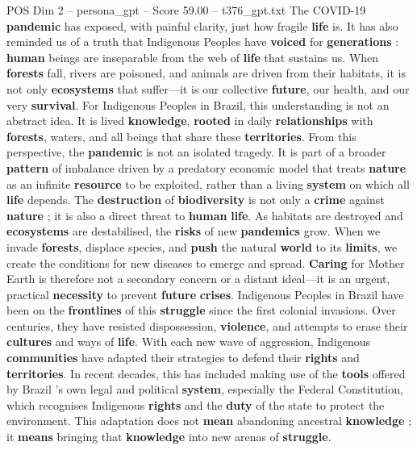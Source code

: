\begin{textsample}{POS Dim 2 – persona\_gpt – Score 59.00 – t376\_gpt.txt}  \label{ex:f2_pos_013}
The COVID-19 \textbf{pandemic} has exposed, with painful clarity, just how fragile \textbf{life} is.
It has also reminded us of a truth that Indigenous Peoples have \textbf{voiced} for \textbf{generations} : \textbf{human} beings are inseparable from the web of \textbf{life} that sustains us.
When \textbf{forests} fall, rivers are poisoned, and animals are driven from their habitats, it is not only \textbf{ecosystems} that suffer—it is our collective \textbf{future}, our health, and our very \textbf{survival}.
For Indigenous Peoples in Brazil, this understanding is not an abstract idea.
It is lived \textbf{knowledge}, \textbf{rooted} in daily \textbf{relationships} with \textbf{forests}, waters, and all beings that share these \textbf{territories}.
From this perspective, the \textbf{pandemic} is not an isolated tragedy.
It is part of a broader \textbf{pattern} of imbalance driven by a predatory economic model that treats \textbf{nature} as an infinite \textbf{resource} to be exploited, rather than a living \textbf{system} on which all \textbf{life} depends.
The \textbf{destruction} of \textbf{biodiversity} is not only a \textbf{crime} against \textbf{nature} ; it is also a direct threat to \textbf{human} \textbf{life}.
As habitats are destroyed and \textbf{ecosystems} are destabilised, the \textbf{risks} of new \textbf{pandemics} grow.
When we invade \textbf{forests}, displace species, and \textbf{push} the natural \textbf{world} to its \textbf{limits}, we create the conditions for new diseases to emerge and spread. \textbf{Caring} for Mother Earth is therefore not a secondary concern or a distant ideal—it is an urgent, practical \textbf{necessity} to prevent \textbf{future} \textbf{crises}.
Indigenous Peoples in Brazil have been on the \textbf{frontlines} of this \textbf{struggle} since the first colonial invasions.
Over centuries, they have resisted dispossession, \textbf{violence}, and attempts to erase their \textbf{cultures} and ways of \textbf{life}.
With each new wave of aggression, Indigenous \textbf{communities} have adapted their strategies to defend their \textbf{rights} and \textbf{territories}.
In recent decades, this has included making use of the \textbf{tools} offered by Brazil ’s own legal and political \textbf{system}, especially the Federal Constitution, which recognises Indigenous \textbf{rights} and the \textbf{duty} of the state to protect the environment.
This adaptation does not \textbf{mean} abandoning ancestral \textbf{knowledge} ; it \textbf{means} bringing that \textbf{knowledge} into new arenas of \textbf{struggle}.

\end{textsample}
